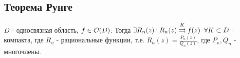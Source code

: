 \subsection{Теорема Рунге}
\begin{theorem}
  $D$ - односвязная область, $f\in\mathcal{O}(D)$. Тогда $\exists R_n(z)\colon R_n(z)\overset{K}{\rightrightarrows}f(z)\hspace{0.2cm}\forall K\subset D$ - компакта, где $R_n$ - рациональные функции, т.е. $R_n(z)=\frac{P_n(z)}{Q_n(z)}$, где $P_n,Q_n$ - многочлены. 
\end{theorem}
